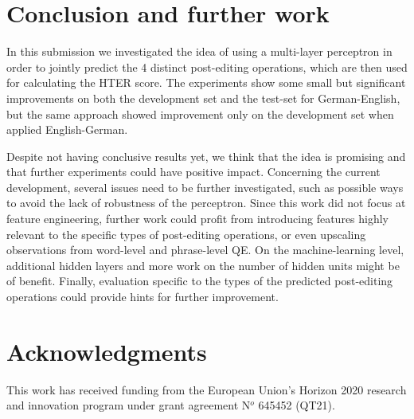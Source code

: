 \documentclass[11pt,letterpaper]{article}
\begin{document}
\section{Conclusion and further work}

In this submission we investigated the idea of using a multi-layer perceptron
in order to jointly predict the 4 distinct post-editing operations, which are
then used for calculating the HTER score. The experiments show some small but
significant improvements on both the development set and the test-set for
German-English, but the same approach showed improvement only on the development
set when applied English-German.

Despite not having conclusive results yet, we think that the idea is promising
and that further experiments could have positive impact. Concerning the current
development, several issues need to be further investigated, such as possible
ways to avoid the lack of robustness of the perceptron.
Since this work did not focus at feature engineering, further work could profit
from introducing features highly relevant to the specific types of post-editing
operations, or even upscaling observations from word-level and phrase-level QE.
On the machine-learning level, additional hidden layers and more work on the
number of hidden units might be of benefit. Finally, evaluation specific to the
types of the predicted post-editing operations could provide hints for further
improvement.

\label{sec:conclusions}

\section*{Acknowledgments}
This work has received funding from the European Union's Horizon 2020
research and innovation program under grant agreement N$^{o}$ 645452 (QT21).



% 


\end{document}
